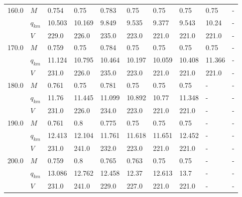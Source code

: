 \begin{tabular}{|l|l|llllllll|}
\hline
160.0 & $M$ &   0.754 &    0.75 &   0.783 &                     0.75 &    0.75\cellcolor{green} &                    0.75 &    0.75 &      - \\
      & $q_{km}$ &  10.503 &  10.169 &   9.849 &                    9.535 &   9.377\cellcolor{green} &                   9.543 &   10.24 &      - \\
      & $V$ &   229.0 &   226.0 &   235.0 &                    223.0 &   221.0\cellcolor{green} &                   221.0 &   221.0 &      - \\
\hline
170.0 & $M$ &   0.759 &    0.75 &   0.784 &                     0.75 &    0.75\cellcolor{green} &                    0.75 &    0.75 &      - \\
      & $q_{km}$ &  11.124 &  10.795 &  10.464 &                   10.197 &  10.059\cellcolor{green} &                  10.408 &  11.366 &      - \\
      & $V$ &   231.0 &   226.0 &   235.0 &                    223.0 &   221.0\cellcolor{green} &                   221.0 &   221.0 &      - \\
\hline
180.0 & $M$ &   0.761 &    0.75 &   0.781 &                     0.75 &    0.75\cellcolor{green} &                    0.75 &       - &      - \\
      & $q_{km}$ &   11.76 &  11.445 &  11.099 &                   10.892 &   10.77\cellcolor{green} &                  11.348 &       - &      - \\
      & $V$ &   231.0 &   226.0 &   234.0 &                    223.0 &   221.0\cellcolor{green} &                   221.0 &       - &      - \\
\hline
190.0 & $M$ &   0.761 &     0.8 &   0.775 &    0.75\cellcolor{green} &                     0.75 &                    0.75 &       - &      - \\
      & $q_{km}$ &  12.413 &  12.104 &  11.761 &  11.618\cellcolor{green} &                   11.651 &                  12.452 &       - &      - \\
      & $V$ &   231.0 &   241.0 &   232.0 &   223.0\cellcolor{green} &                    221.0 &                   221.0 &       - &      - \\
\hline
200.0 & $M$ &   0.759 &     0.8 &   0.765 &   0.763\cellcolor{green} &                     0.75 &                    0.75 &       - &      - \\
      & $q_{km}$ &  13.086 &  12.762 &  12.458 &   12.37\cellcolor{green} &                   12.613 &                    13.7 &       - &      - \\
      & $V$ &   231.0 &   241.0 &   229.0 &   227.0\cellcolor{green} &                    221.0 &                   221.0 &       - &      - \\
\hline
\end{tabular}